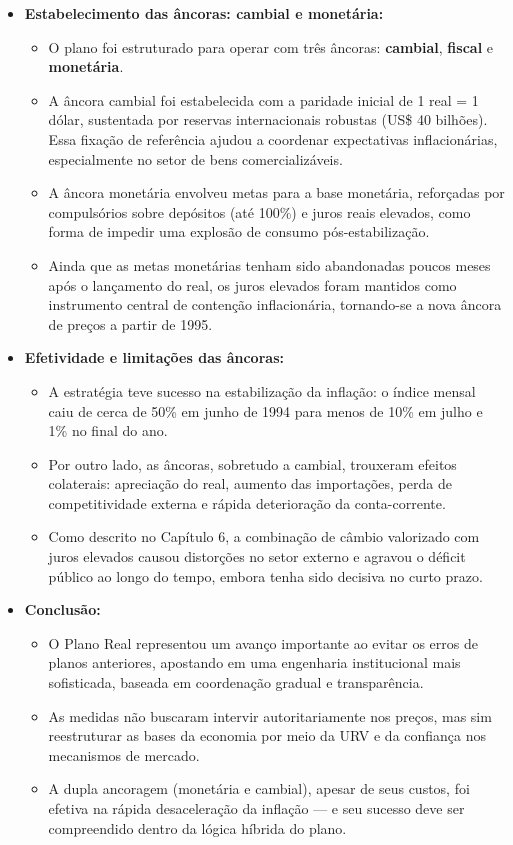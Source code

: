 \documentclass[a4paper,12pt]{article}[abntex2]
\begin{document}
\begin{itemize}
    \item \textbf{Estabelecimento das âncoras: cambial e monetária:}
    \begin{itemize}
        \item O plano foi estruturado para operar com três âncoras: \textbf{cambial}, \textbf{fiscal} e \textbf{monetária}.
        \item A âncora cambial foi estabelecida com a paridade inicial de 1 real = 1 dólar, sustentada por reservas internacionais robustas (US\$ 40 bilhões). Essa fixação de referência ajudou a coordenar expectativas inflacionárias, especialmente no setor de bens comercializáveis.
        \item A âncora monetária envolveu metas para a base monetária, reforçadas por compulsórios sobre depósitos (até 100\%) e juros reais elevados, como forma de impedir uma explosão de consumo pós-estabilização.
        \item Ainda que as metas monetárias tenham sido abandonadas poucos meses após o lançamento do real, os juros elevados foram mantidos como instrumento central de contenção inflacionária, tornando-se a nova âncora de preços a partir de 1995.
    \end{itemize}

    \item \textbf{Efetividade e limitações das âncoras:}
    \begin{itemize}
        \item A estratégia teve sucesso na estabilização da inflação: o índice mensal caiu de cerca de 50\% em junho de 1994 para menos de 10\% em julho e 1\% no final do ano.
        \item Por outro lado, as âncoras, sobretudo a cambial, trouxeram efeitos colaterais: apreciação do real, aumento das importações, perda de competitividade externa e rápida deterioração da conta-corrente.
        \item Como descrito no Capítulo 6, a combinação de câmbio valorizado com juros elevados causou distorções no setor externo e agravou o déficit público ao longo do tempo, embora tenha sido decisiva no curto prazo.
    \end{itemize}

    \item \textbf{Conclusão:}
    \begin{itemize}
        \item O Plano Real representou um avanço importante ao evitar os erros de planos anteriores, apostando em uma engenharia institucional mais sofisticada, baseada em coordenação gradual e transparência.
        \item As medidas não buscaram intervir autoritariamente nos preços, mas sim reestruturar as bases da economia por meio da URV e da confiança nos mecanismos de mercado.
        \item A dupla ancoragem (monetária e cambial), apesar de seus custos, foi efetiva na rápida desaceleração da inflação — e seu sucesso deve ser compreendido dentro da lógica híbrida do plano.
    \end{itemize}

\end{itemize}
\end{document}

